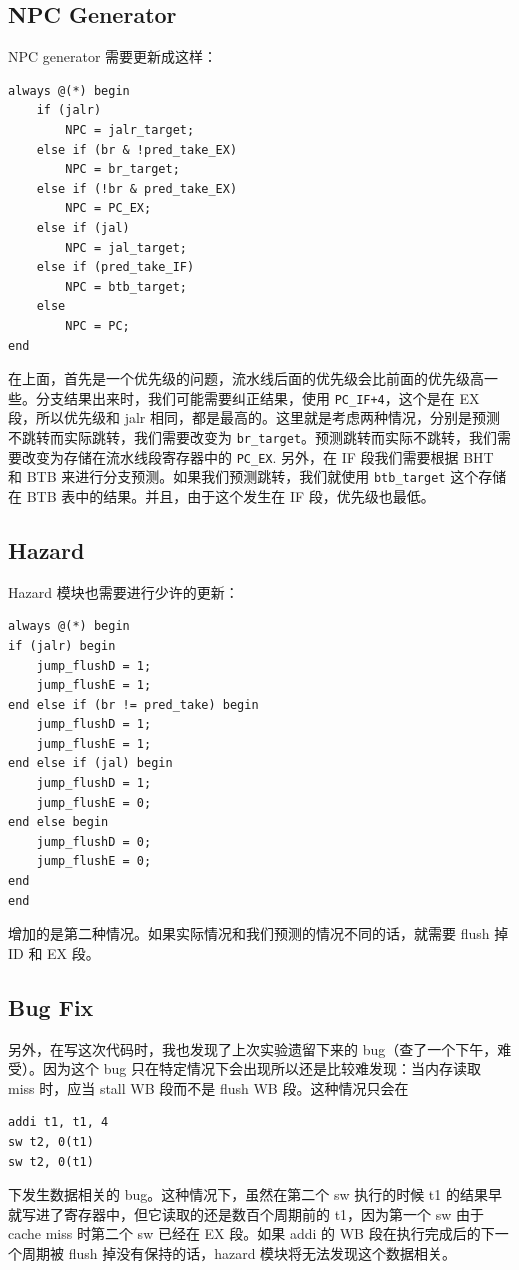 \documentclass{article}
\begin{document}
\subsection{NPC Generator}
NPC generator 需要更新成这样：
\begin{verbatim}
always @(*) begin
    if (jalr)
        NPC = jalr_target;
    else if (br & !pred_take_EX)
        NPC = br_target;
    else if (!br & pred_take_EX)
        NPC = PC_EX;
    else if (jal)
        NPC = jal_target;
    else if (pred_take_IF)
        NPC = btb_target;
    else
        NPC = PC;
end
\end{verbatim}
在上面，首先是一个优先级的问题，流水线后面的优先级会比前面的优先级高一些。分支结果出来时，我们可能需要纠正结果，使用 \texttt{PC_IF+4}，这个是在 EX 段，所以优先级和 jalr 相同，都是最高的。这里就是考虑两种情况，分别是预测不跳转而实际跳转，我们需要改变为 \texttt{br_target}。预测跳转而实际不跳转，我们需要改变为存储在流水线段寄存器中的 \texttt{PC_EX}. 另外，在 IF 段我们需要根据 BHT 和 BTB 来进行分支预测。如果我们预测跳转，我们就使用 \texttt{btb_target} 这个存储在 BTB 表中的结果。并且，由于这个发生在 IF 段，优先级也最低。

\subsection{Hazard}

Hazard 模块也需要进行少许的更新：
\begin{verbatim}
always @(*) begin
if (jalr) begin
    jump_flushD = 1;
    jump_flushE = 1;
end else if (br != pred_take) begin
    jump_flushD = 1;
    jump_flushE = 1;
end else if (jal) begin
    jump_flushD = 1;
    jump_flushE = 0;
end else begin
    jump_flushD = 0;
    jump_flushE = 0;
end
end
\end{verbatim}
增加的是第二种情况。如果实际情况和我们预测的情况不同的话，就需要 flush 掉 ID 和 EX 段。

\subsection{Bug Fix}
另外，在写这次代码时，我也发现了上次实验遗留下来的 bug（查了一个下午，难受）。因为这个 bug 只在特定情况下会出现所以还是比较难发现：当内存读取 miss 时，应当 stall WB 段而不是 flush WB 段。这种情况只会在
\begin{verbatim}
addi t1, t1, 4
sw t2, 0(t1)
sw t2, 0(t1)
\end{verbatim}
下发生数据相关的 bug。这种情况下，虽然在第二个 sw 执行的时候 t1 的结果早就写进了寄存器中，但它读取的还是数百个周期前的 t1，因为第一个 sw 由于 cache miss 时第二个 sw 已经在 EX 段。如果 addi 的 WB 段在执行完成后的下一个周期被 flush 掉没有保持的话，hazard 模块将无法发现这个数据相关。
\end{document}
